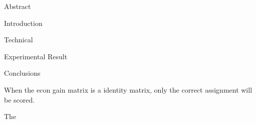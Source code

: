 \documentclass{article}
\begin{document}
Abstract


Introduction







Technical


Experimental Result


Conclusions

When the econ gain matrix is a identity matrix, only the correct assignment will be scored.

The
\end{document}
